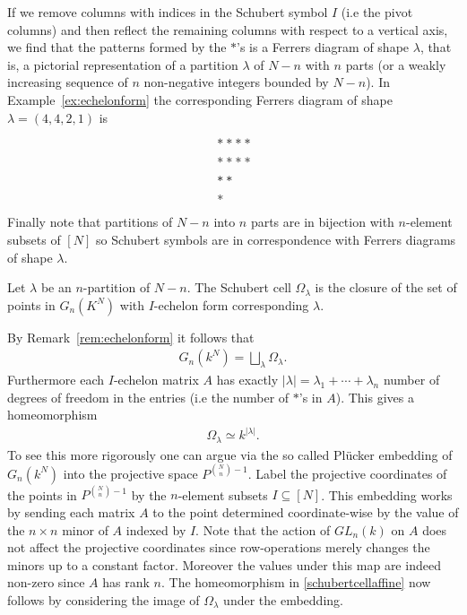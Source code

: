 \documentclass[a4paper,openany]{scrbook}
\begin{document}
\begin{remark}
If we remove columns with indices in the Schubert symbol $I$ (i.e the pivot columns) and then reflect the remaining columns with respect to a vertical axis, we find that the patterns formed by the $*$'s is a Ferrers diagram of shape $\lambda$, that is, a pictorial representation of a partition $\lambda$ of $N-n$ with $n$ parts (or a weakly increasing sequence of $n$ non-negative integers bounded by $N-n$). In Example~\ref{ex:echelonform} the corresponding Ferrers diagram of shape $\lambda = (4,4,2,1)$ is
\begin{align*}
\displaystyle &**** \\	
	      &**** \\   
	      &**   \\
	      &\hspace{0.08cm} * 
\end{align*} \noindent
Finally note that partitions of $N-n$ into $n$ parts are in bijection with $n$-element subsets of $[N]$ so Schubert symbols are in correspondence with Ferrers diagrams of shape $\lambda$.
\end{remark} \noindent
\begin{defn}
Let $\lambda$ be an $n$-partition of $N-n$.
The Schubert cell $\Omega_{\lambda}$ is the closure of the set of points in $G_n(K^N)$ with $I$-echelon form corresponding $\lambda$.
\end{defn} \noindent
\begin{remark}
By Remark~\ref{rem:echelonform} it follows that 
\begin{align*}
\displaystyle G_n(k^N) = \bigsqcup_{\lambda} \Omega_{\lambda}.
\end{align*} \noindent
Furthermore each $I$-echelon matrix $A$ has exactly $|\lambda| = \lambda_1 + \cdots + \lambda_n$ number of degrees of freedom in the entries (i.e the number of $*$'s in $A$). This gives a homeomorphism 
\begin{align}
\label{schubertcellaffine}
\Omega_{\lambda} \simeq k^{|\lambda|}.
\end{align} \noindent
To see this more rigorously one can argue via the so called Pl\"ucker embedding of $G_n(k^N)$ into the projective space $P^{\binom{N}{n} - 1}$. Label the projective coordinates of the points in $P^{\binom{N}{n} - 1}$ by the $n$-element subsets $I \subseteq [N]$. This embedding works by sending each matrix $A$ to the point determined coordinate-wise by the value of the $n \times n$ minor of $A$ indexed by $I$. Note that the action of $GL_n(k)$ on $A$ does not affect the projective coordinates since row-operations merely changes the minors up to a constant factor. Moreover the values under this map are indeed non-zero since $A$ has rank $n$. The homeomorphism in \ref{schubertcellaffine} now follows by considering the image of $\Omega_{\lambda}$ under the embedding. 
\end{remark}
\end{document}
